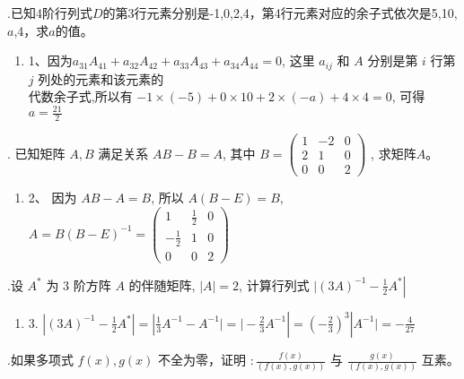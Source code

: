 \documentclass{article}
\begin{document}
\setlength{\parindent}{2em}                       %
{.}已知4阶行列式${D}$的第3行元素分别是-1,0,2,4，第4行元素对应的余子式依次是5,10,$a$,4，求$a$的值。
\begin{enumerate}[\qquad 解：]
    \item 1、因为$a_{31}A_{41}+a_{32}A_{42}+a_{33}A_{43}+a_{34}A_{44}=0$,
          这里 $a_{i j}$ 和 $A$ 分别是第 ${i}$ 行第 $j$ 列处的元素和该元素的 \\
          代数余子式,所以有 $-1 \times(-5)+0 \times 10+2 \times(-a)+4 \times 4=0$,
          可得 $a=\frac{21}{2}$
\end{enumerate}

\vspace{1ex}
{.} 已知矩阵 $A, B$ 满足关系 $A B-B=A$, 其中 $B=\left(
    \begin{array}{ccc}
            1 & -2 & 0 \\
            2 & 1  & 0 \\
            0 & 0  & 2
        \end{array}
    \right)$
, 求矩阵$A$。
\begin{enumerate}[\qquad 解：]
    \item 2、 因为 ${A B-A=B}$, 所以 $A(B-E)=B$, $A=B(B-E)^{-1}=\left(
              \begin{array}{ccc}
                      1            & \frac{1}{2} & 0 \\
                      -\frac{1}{2} & 1           & 0 \\
                      0            & 0           & 2
                  \end{array}
              \right)$
\end{enumerate}

\vspace{1ex}
{.}设 $A^{*}$ 为 $3$ 阶方阵 $A$ 的伴随矩阵, $|A|=2$, 计算行列式 $|(3 A)^{-1}-\left.\frac{1}{2} A^{*}\right|$
\begin{enumerate}[\qquad 解：]
    \item 3. $|(3 A)^{-1}-\left.\frac{1}{2} A^{*}\right|=|\frac{1}{3}A^{-1}-A^{-1}|=|-\frac{2}{3}A^{-1}|=(-\frac{2}{3})^{3}|A^{-1}|=-\frac{4}{27}$
\end{enumerate}

\vspace{1ex}
{.}如果多项式 $f(x), g(x)$ 不全为零，证明 $: \frac{f(x)}{(f(x), g(x))}$ 与 $\frac{g(x)}{(f(x), g(x))}$ 互素。
\end{document}
